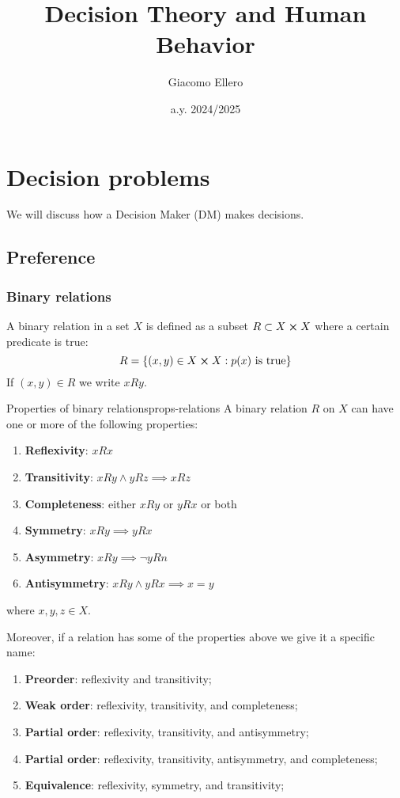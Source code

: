\documentclass[12pt]{extarticle}
\title{Decision Theory and Human Behavior}
\author{Giacomo Ellero}
\date{a.y. 2024/2025}
\begin{document}
\firstpage

\section{Decision problems}

We will discuss how a Decision Maker (DM) makes decisions.

\subsection{Preference}

\subsubsection{Binary relations}

A binary relation in a set $X$ is defined as a subset $R \subset X \cross X$ where a certain predicate is true:
\begin{equation}
	R = \{ (x, y) \in X \cross X : p(x) \text{ is true}\}
\end{equation}
If $(x, y) \in R$ we write $xRy$.

\begin{definition}{Properties of binary relations}{props-relations}
	A binary relation $R$ on $X$ can have one or more of the following properties:
	\begin{enumerate}
		\item \textbf{Reflexivity}: $xRx$
		\item \textbf{Transitivity}: $xRy \land yRz \implies xRz$
		\item \textbf{Completeness}: either $xRy$ or $yRx$ or both
		\item \textbf{Symmetry}: $xRy \implies yRx$
		\item \textbf{Asymmetry}: $xRy \implies \lnot yRn$
		\item \textbf{Antisymmetry}: $xRy \land yRx \implies x = y$
	\end{enumerate}
	where $x, y, z \in X$.

	Moreover, if a relation has some of the properties above we give it a specific name:
	\begin{enumerate}
		\item \textbf{Preorder}: reflexivity and transitivity;
		\item \textbf{Weak order}: reflexivity, transitivity, and completeness;
		\item \textbf{Partial order}: reflexivity, transitivity, and antisymmetry;
		\item \textbf{Partial order}: reflexivity, transitivity, antisymmetry, and completeness;
		\item \textbf{Equivalence}: reflexivity, symmetry, and transitivity;
	\end{enumerate}
\end{definition}
\end{document}
